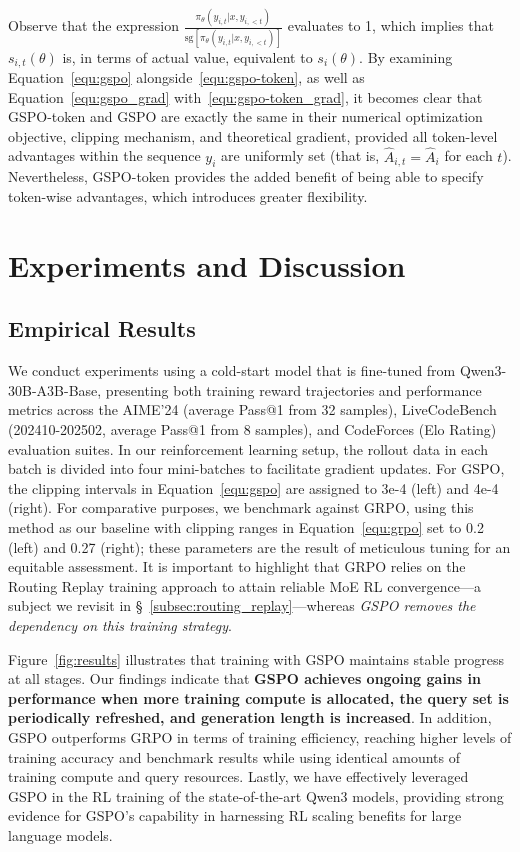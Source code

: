 Observe that the expression $\frac{ \pi_{\theta} (y_{i,t} | x, y_{i,<t}) }{ \mathrm{sg} \left[ \pi_{\theta} (y_{i,t} | x, y_{i,<t}) \right] }$ evaluates to 1, which implies that $s_{i,t}(\theta)$ is, in terms of actual value, equivalent to $s_{i}(\theta)$.
By examining Equation~\eqref{equ:gspo} alongside~\eqref{equ:gspo-token}, as well as Equation~\eqref{equ:gspo_grad} with~\eqref{equ:gspo-token_grad}, it becomes clear that GSPO-token and GSPO are exactly the same in their numerical optimization objective, clipping mechanism, and theoretical gradient, provided all token-level advantages within the sequence $y_i$ are uniformly set (that is, $\widehat{A}_{i,t} = \widehat{A}_{i}$ for each $t$). Nevertheless, GSPO-token provides the added benefit of being able to specify token-wise advantages, which introduces greater flexibility.

\section{Experiments and Discussion}

\subsection{Empirical Results}

We conduct experiments using a cold-start model that is fine-tuned from Qwen3-30B-A3B-Base, presenting both training reward trajectories and performance metrics across the AIME'24 (average Pass@1 from 32 samples), LiveCodeBench (202410-202502, average Pass@1 from 8 samples), and CodeForces (Elo Rating) evaluation suites. In our reinforcement learning setup, the rollout data in each batch is divided into four mini-batches to facilitate gradient updates. For GSPO, the clipping intervals in Equation~\eqref{equ:gspo} are assigned to 3e-4 (left) and 4e-4 (right). For comparative purposes, we benchmark against GRPO, using this method as our baseline with clipping ranges in Equation~\eqref{equ:grpo} set to 0.2 (left) and 0.27 (right); these parameters are the result of meticulous tuning for an equitable assessment. It is important to highlight that GRPO relies on the Routing Replay training approach to attain reliable MoE RL convergence—a subject we revisit in \S~\ref{subsec:routing_replay}—whereas \textit{GSPO removes the dependency on this training strategy}.

Figure~\ref{fig:results} illustrates that training with GSPO maintains stable progress at all stages. Our findings indicate that \textbf{GSPO achieves ongoing gains in performance when more training compute is allocated, the query set is periodically refreshed, and generation length is increased}. In addition, GSPO outperforms GRPO in terms of training efficiency, reaching higher levels of training accuracy and benchmark results while using identical amounts of training compute and query resources. Lastly, we have effectively leveraged GSPO in the RL training of the state-of-the-art Qwen3 models, providing strong evidence for GSPO's capability in harnessing RL scaling benefits for large language models.

